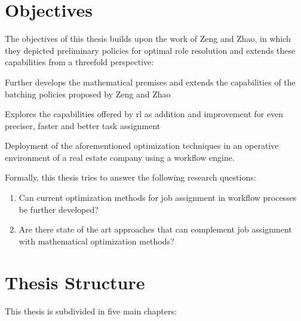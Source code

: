 \documentclass{seal_thesis}
\begin{document}
\section{Objectives}
\label{sec:objectives}

The objectives of this thesis builds upon the work of Zeng and Zhao, in which they depicted preliminary policies for optimal role resolution \cite{Zeng2005} and extends these capabilities from a threefold perspective:
\begin{enumerate*}
	\item Further develops the mathematical premises and extends the capabilities of the batching policies proposed by Zeng and Zhao
	\item Explores the capabilities offered by \gls{rl} as addition and improvement for even preciser, faster and better task assignment
	\item Deployment of the aforementioned optimization techniques in an operative environment of a real estate company using a workflow engine.
\end{enumerate*}

Formally, this thesis tries to answer the following research questions:

\begin{enumerate}[label=\textbf{RQ. \arabic*},ref=Research Question \arabic*]
\item Can current optimization methods for job assignment in workflow processes be further developed? \label{rq:one}
\item Are there state of the art approaches that can complement job assignment with mathematical optimization methods? \label{rq:two}
\end{enumerate}

\section{Thesis Structure}

This thesis is subdivided in five main chapters:
\end{document}
